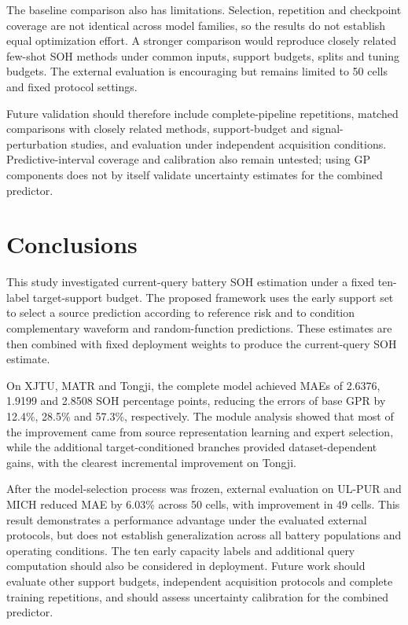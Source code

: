\documentclass[preprint,12pt]{elsarticle}
\begin{document}
The baseline comparison also has limitations. Selection, repetition and checkpoint coverage are not identical across model families, so the results do not establish equal optimization effort. A stronger comparison would reproduce closely related few-shot SOH methods under common inputs, support budgets, splits and tuning budgets. The external evaluation is encouraging but remains limited to 50 cells and fixed protocol settings.

Future validation should therefore include complete-pipeline repetitions, matched comparisons with closely related methods, support-budget and signal-perturbation studies, and evaluation under independent acquisition conditions. Predictive-interval coverage and calibration also remain untested; using GP components does not by itself validate uncertainty estimates for the combined predictor.

\section{Conclusions}
\label{sec:conclusion}
This study investigated current-query battery SOH estimation under a fixed ten-label target-support budget. The proposed framework uses the early support set to select a source prediction according to reference risk and to condition complementary waveform and random-function predictions. These estimates are then combined with fixed deployment weights to produce the current-query SOH estimate.

On XJTU, MATR and Tongji, the complete model achieved MAEs of 2.6376, 1.9199 and 2.8508 SOH percentage points, reducing the errors of base GPR by 12.4\%, 28.5\% and 57.3\%, respectively. The module analysis showed that most of the improvement came from source representation learning and expert selection, while the additional target-conditioned branches provided dataset-dependent gains, with the clearest incremental improvement on Tongji.

After the model-selection process was frozen, external evaluation on UL-PUR and MICH reduced MAE by 6.03\% across 50 cells, with improvement in 49 cells. This result demonstrates a performance advantage under the evaluated external protocols, but does not establish generalization across all battery populations and operating conditions. The ten early capacity labels and additional query computation should also be considered in deployment. Future work should evaluate other support budgets, independent acquisition protocols and complete training repetitions, and should assess uncertainty calibration for the combined predictor.
\end{document}
